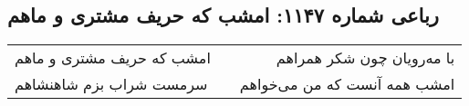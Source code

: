 \begin{center}
\section*{رباعی شماره ۱۱۴۷: امشب که حریف مشتری و ماهم}
\label{sec:1147}
\begin{longtable}{l p{0.5cm} r}
امشب که حریف مشتری و ماهم
&&
با مه‌رویان چون شکر همراهم
\\
سرمست شراب بزم شاهنشاهم
&&
امشب همه آنست که من می‌خواهم
\\
\end{longtable}
\end{center}
